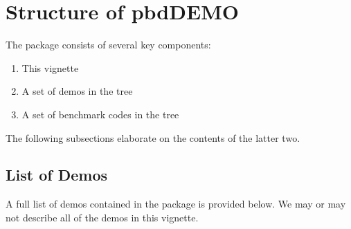 \section{Structure of pbdDEMO}

The  package consists of several key components:

\begin{enumerate}
  \item This vignette
  \item A set of demos in the  tree
  \item A set of benchmark codes in the  tree
\end{enumerate}

The following subsections elaborate on the contents of the latter two.


\subsection{List of Demos}
\label{sec:demolist}

A full list of demos contained in the  package is provided below.
We may or may not describe all of the demos in this vignette.

